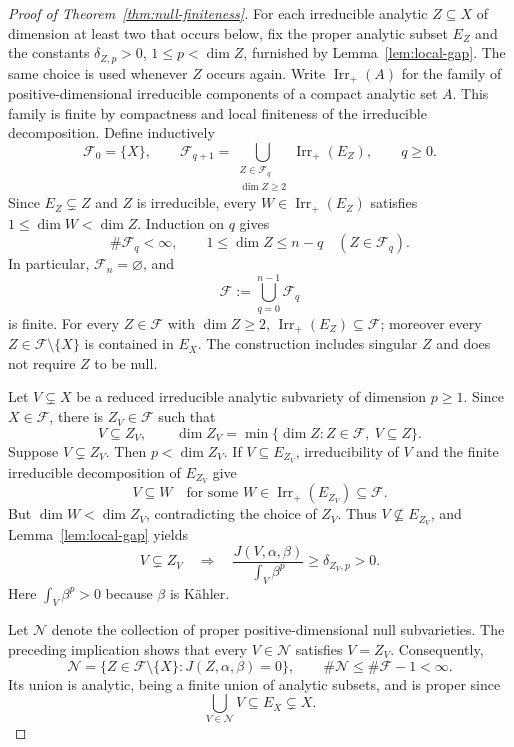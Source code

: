 \documentclass[reqno]{amsart}
\theoremstyle{remark}
\theoremstyle{plain}
\begin{document}
\begin{proof}[Proof of Theorem~\ref{thm:null-finiteness}]
For each irreducible analytic \(Z\subseteq X\) of dimension at least two
that occurs below, fix the proper analytic subset \(E_Z\) and the constants
\(\delta_{Z,p}>0\), \(1\le p<\dim Z\), furnished by
Lemma~\ref{lem:local-gap}. The same choice is used whenever \(Z\) occurs
again. Write \(\operatorname{Irr}_+(A)\) for the family of
positive-dimensional irreducible components of a compact analytic set
\(A\). This family is finite by compactness and local finiteness of the
irreducible decomposition. Define inductively
\[
\mathcal F_0=\{X\},\qquad
\mathcal F_{q+1}
=\bigcup_{\substack{Z\in\mathcal F_q\\ \dim Z\ge2}}
\operatorname{Irr}_+(E_Z),\qquad q\ge0.
\]
Since \(E_Z\subsetneq Z\) and \(Z\) is irreducible, every
\(W\in\operatorname{Irr}_+(E_Z)\) satisfies
\(1\le\dim W<\dim Z\). Induction on \(q\) gives
\[
\#\mathcal F_q<\infty,\qquad
1\le\dim Z\le n-q\quad(Z\in\mathcal F_q).
\]
In particular, \(\mathcal F_n=\varnothing\), and
\[
\mathcal F:=\bigcup_{q=0}^{n-1}\mathcal F_q
\]
is finite.  For every \(Z\in\mathcal F\) with \(\dim Z\ge2\),
\(\operatorname{Irr}_+(E_Z)\subseteq\mathcal F\); moreover every
\(Z\in\mathcal F\setminus\{X\}\) is contained in \(E_X\). The construction includes singular \(Z\) and does not require \(Z\) to
be null. 

Let \(V\subsetneq X\) be a reduced irreducible analytic subvariety of
dimension \(p\ge1\). Since \(X\in\mathcal F\), there is
\(Z_V\in\mathcal F\) such that
\[
V\subseteq Z_V,\qquad
\dim Z_V=\min\{\dim Z:Z\in\mathcal F,\ V\subseteq Z\}.
\]
Suppose \(V\subsetneq Z_V\). Then \(p<\dim Z_V\). If
\(V\subseteq E_{Z_V}\), irreducibility of \(V\) and the finite
irreducible decomposition of \(E_{Z_V}\) give
\[
V\subseteq W\quad\text{for some }
W\in\operatorname{Irr}_+(E_{Z_V})\subseteq\mathcal F.
\]
But \(\dim W<\dim Z_V\), contradicting the choice of \(Z_V\).
Thus \(V\not\subseteq E_{Z_V}\), and Lemma~\ref{lem:local-gap} yields
\[
V\subsetneq Z_V\quad\Longrightarrow\quad
\frac{J(V,\alpha,\beta)}{\int_V\beta^p}\ge\delta_{Z_V,p}>0.
\]
Here \(\int_V\beta^p>0\) because \(\beta\) is K\"ahler.

Let \(\mathcal N\) denote the collection of proper positive-dimensional
null subvarieties. The preceding implication shows that every
\(V\in\mathcal N\) satisfies \(V=Z_V\). Consequently,
\[
\mathcal N
=\{Z\in\mathcal F\setminus\{X\}:J(Z,\alpha,\beta)=0\},\qquad
\#\mathcal N\le\#\mathcal F-1<\infty.
\]
Its union is analytic, being a finite union of analytic subsets, and is
proper since
\[
\bigcup_{V\in\mathcal N}V\subseteq E_X\subsetneq X.
\]


\end{proof}
\end{document}

